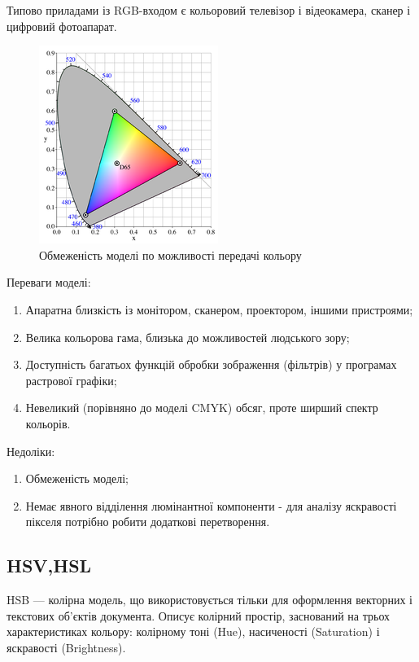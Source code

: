 Типово приладами із RGB-входом є кольоровий телевізор і відеокамера, сканер і цифровий фотоапарат.

\begin{figure}[H]
	\centering
	\includegraphics[width=0.7\linewidth]{theory/img/rgb_limitations}
	\caption{Обмеженість моделі по можливості передачі кольору}
\end{figure}

Переваги моделі:
\begin{enumerate}
	\item Апаратна близкість із монітором, сканером, проектором, іншими пристроями;
	\item Велика кольорова гама, близька до можливостей людського зору;
	\item Доступність багатьох функцій обробки зображення (фільтрів) у програмах растрової графіки;
	\item Невеликий (порівняно до моделі CMYK) обсяг, проте ширший спектр кольорів.
\end{enumerate}
\bigbreak
Недоліки:
\begin{enumerate}
	\item Обмеженість моделі;
	\item Немає явного відділення люмінантної компоненти - для аналізу яскравості пікселя потрібно робити додаткові перетворення.
\end{enumerate}

\subsection{HSV,HSL}
HSB — колірна модель, що використовується тільки для оформлення векторних і текстових об'єктів документа. Описує колірний простір, заснований на трьох характеристиках кольору: колірному тоні (Hue), насиченості (Saturation) і яскравості (Brightness).

